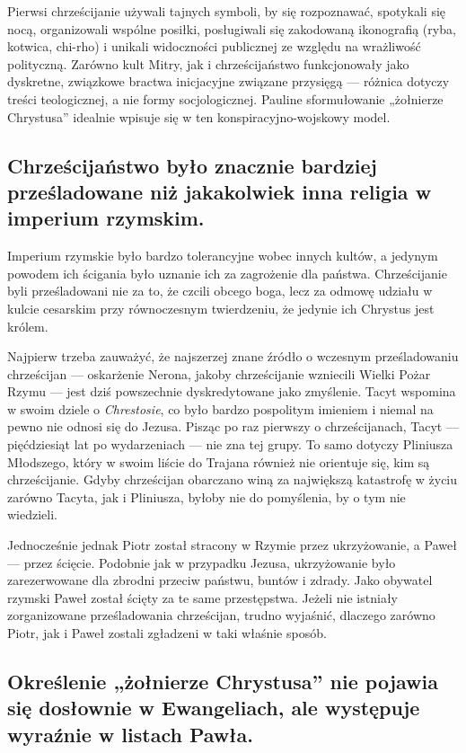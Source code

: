 Pierwsi chrześcijanie używali tajnych symboli, by się rozpoznawać, spotykali się nocą, organizowali wspólne posiłki, posługiwali się zakodowaną ikonografią (ryba, kotwica, chi-rho) i unikali widoczności publicznej ze względu na wrażliwość polityczną.
Zarówno kult Mitry, jak i chrześcijaństwo funkcjonowały jako dyskretne, związkowe bractwa inicjacyjne związane przysięgą — różnica dotyczy treści teologicznej, a nie formy socjologicznej.
Pauline sformułowanie „żołnierze Chrystusa” idealnie wpisuje się w ten konspiracyjno-wojskowy model.

\subsection{Chrześcijaństwo było znacznie bardziej prześladowane niż jakakolwiek inna religia w imperium rzymskim.}\label{subsec:christianity-much-more-prosecuted-than-any-other-religion-in-the-roman-empire.}

Imperium rzymskie było bardzo tolerancyjne wobec innych kultów, a jedynym powodem ich ścigania było uznanie ich za zagrożenie dla państwa.
Chrześcijanie byli prześladowani nie za to, że czcili obcego boga, lecz za odmowę udziału w kulcie cesarskim przy równoczesnym twierdzeniu, że jedynie ich Chrystus jest królem.

Najpierw trzeba zauważyć, że najszerzej znane źródło o wczesnym prześladowaniu chrześcijan — oskarżenie Nerona, jakoby chrześcijanie wzniecili Wielki Pożar Rzymu — jest dziś powszechnie dyskredytowane jako zmyślenie.
Tacyt wspomina w swoim dziele o \emph{Chrestosie}, co było bardzo pospolitym imieniem i niemal na pewno nie odnosi się do Jezusa.
Pisząc po raz pierwszy o chrześcijanach, Tacyt — pięćdziesiąt lat po wydarzeniach — nie zna tej grupy.
To samo dotyczy Pliniusza Młodszego, który w swoim liście do Trajana również nie orientuje się, kim są chrześcijanie.
Gdyby chrześcijan obarczano winą za największą katastrofę w życiu zarówno Tacyta, jak i Pliniusza, byłoby nie do pomyślenia, by o tym nie wiedzieli.

Jednocześnie jednak Piotr został stracony w Rzymie przez ukrzyżowanie, a Paweł — przez ścięcie.
Podobnie jak w przypadku Jezusa, ukrzyżowanie było zarezerwowane dla zbrodni przeciw państwu, buntów i zdrady.
Jako obywatel rzymski Paweł został ścięty za te same przestępstwa.
Jeżeli nie istniały zorganizowane prześladowania chrześcijan, trudno wyjaśnić, dlaczego zarówno Piotr, jak i Paweł zostali zgładzeni w taki właśnie sposób.

\subsection{Określenie „żołnierze Chrystusa” nie pojawia się dosłownie w Ewangeliach, ale występuje wyraźnie w listach Pawła.}\label{subsec:the-phrase-soldiers-of-christ-is-not-used-explicitly-in-the-gospels-but-it-appears-prominently-in-the-pauline-epistles-particularly-in-the-context-of-the-christian-life-being-compared-to-a-military-struggle-or-a-spiritual-battle.}

